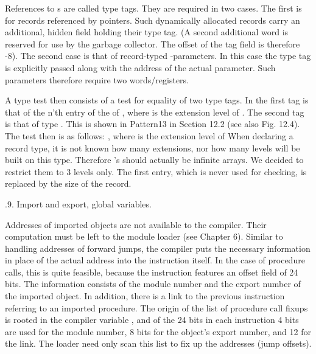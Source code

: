 References to s are called type tags. They are required in two cases. The first is for records referenced by pointers. Such dynamically allocated records carry an additional, hidden field holding their type tag. (A second additional word is reserved for use by the garbage collector. The offset of the tag field is therefore -8). The second case is that of record-typed -parameters. In this case the type tag is explicitly passed along with the address of the actual parameter. Such parameters therefore require two words/registers.

A type test then consists of a test for equality of two type tags. In  the first tag is that of the n’th entry of the  of , where  is the extension level of . The second tag is that of type . This is shown in Pattern13 in Section 12.2 (see also Fig. 12.4). The test then is as follows:
\medskip
{}, where  is the extension level of 
\medskip
When declaring a record type, it is not known how many extensions, nor how many levels will be built on this type. Therefore ’s should actually be infinite arrays. We decided to restrict them to 3 levels only. The first entry, which is never used for checking, is replaced by the size of the record.

.9. Import and export, global variables.

Addresses of imported objects are not available to the compiler. Their computation must be left to the module loader (see Chapter 6). Similar to handling addresses of forward jumps, the compiler puts the necessary information in place of the actual address into the instruction itself. In the case of procedure calls, this is quite feasible, because the  instruction features an offset field of 24 bits. The information consists of the module number and the export number of the imported object. In addition, there is a link to the previous instruction referring to an imported procedure. The origin of the list of procedure call fixups is rooted in the compiler variable , and of the 24 bits in each  instruction 4 bits are used for the module number, 8 bits for the object's export number, and 12 for the link. The loader need only scan this list to fix up the addresses (jump offsets).

